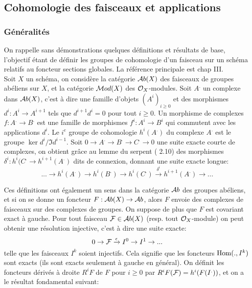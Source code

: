 \subsection{Cohomologie des faisceaux et applications}

\subsubsection{Généralités}

\noindent On rappelle sans démonstrations quelques définitions et résultats de base, l'objectif étant de définir les groupes de cohomologie d'un faisceau sur un schéma relatifs au foncteur sections globales. La référence principale est \cite{Hartshorne} chap III.\\

Soit $X$ un schéma, on considère la catégorie $\mathcal{A} b(X)$ des faisceaux de groupes abéliens sur $X$, et la catégorie $\mathcal{M} od(X)$ des $\mathcal{O}_X$-modules. Soit $A^.$ un complexe dans $\mathcal{A} b(X)$, c'est à dire une famille d'objets $(A^i)_{i\geq 0}$ et des morphismes $d^i:A^i\rightarrow A^{i+1}$ tels que $d^{i+1}d^i=0$ pour tout $i\geq 0$. Un morphisme de complexes $f:A^.\rightarrow B^.$ est une famille de morphismes $f^i:A^i\rightarrow B^i$ qui commutent avec les applications $d^i$. Le $i^e$ groupe de cohomologie $h^i(A^.)$ du complexe $A^.$ est le groupe $\ker d^i/\Im d^{i-1}$. Soit $0\rightarrow A^.\rightarrow B^. \rightarrow C^. \rightarrow 0$ une suite exacte courte de complexes, on obtient grâce au lemme du serpent (\cite{atiyahmacdo} 2.10) des morphismes $\delta ^i:h^i(C^.\rightarrow h^{i+1}(A^.) $ dits de connexion, donnant une suite exacte longue:
\begin{equation}\label{eq:longSES}
...\rightarrow h^i(A^.) \rightarrow h^i(B^.) \rightarrow h^i(C^.) \xrightarrow{\delta ^i} h^{i+1}(A^.) \rightarrow ...
\end{equation}

Ces définitions ont également un sens dans la catégorie $\mathcal{A} b$ des groupes abéliens, et si on se donne un foncteur $F:\mathcal{A} b(X)\rightarrow \mathcal{A} b$, alors $F$ envoie des complexes de faisceaux sur des complexes de groupes. On suppose de plus que $F$ est covariant exact à gauche. Pour tout faisceau $\mathcal{F}\in \mathcal{A} b(X)$ (resp. tout $\mathcal{O}_X$-module) on peut obtenir une résolution injective, c'est à dire une suite exacte:
$$0\rightarrow \mathcal{F} \xrightarrow{\epsilon} I^0\rightarrow I^1\rightarrow ...$$
telle que les faisceaux $I^k$ soient injectifs. Cela signifie que les foncteurs $\operatorname{Hom}(.,I^k)$ sont exacts (ils sont exacts seulement à gauche en général). On définit les foncteurs dérivés à droite $R^iF$ de $F$ pour $i\geq 0$ par $R^i F(\mathcal{F})=h^i(F(I^.))$, et on a le résultat fondamental suivant:

